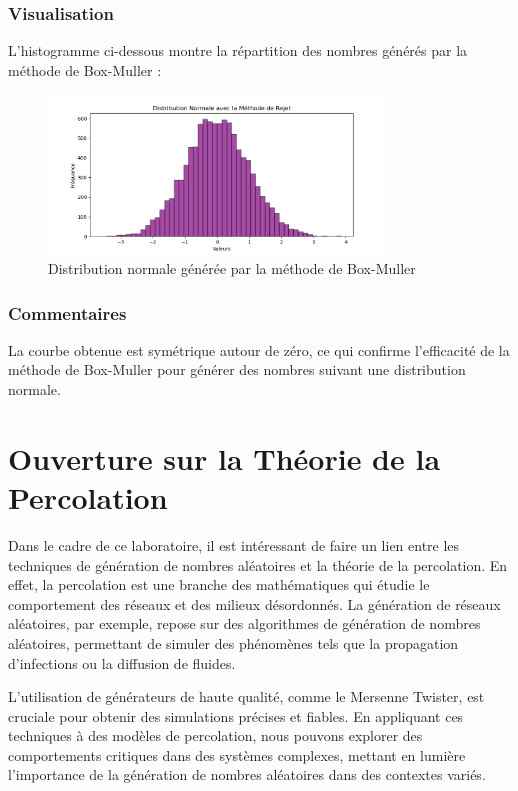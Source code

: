 \documentclass[a4paper,12pt]{report}
\begin{document}
\subsection*{Visualisation}
L'histogramme ci-dessous montre la répartition des nombres générés par la méthode de Box-Muller :

\begin{figure}[h!]
    \centering
    \includegraphics[width=0.8\textwidth]{4.png}
    \caption{Distribution normale générée par la méthode de Box-Muller}
\end{figure}

\subsection*{Commentaires}
La courbe obtenue est symétrique autour de zéro, ce qui confirme l'efficacité de la méthode de Box-Muller pour générer des nombres suivant une distribution normale.

\newpage
\chapter*{Ouverture sur la Théorie de la Percolation}
Dans le cadre de ce laboratoire, il est intéressant de faire un lien entre les techniques de génération de nombres aléatoires et la théorie de la percolation. En effet, la percolation est une branche des mathématiques qui étudie le comportement des réseaux et des milieux désordonnés. La génération de réseaux aléatoires, par exemple, repose sur des algorithmes de génération de nombres aléatoires, permettant de simuler des phénomènes tels que la propagation d'infections ou la diffusion de fluides.

L'utilisation de générateurs de haute qualité, comme le Mersenne Twister, est cruciale pour obtenir des simulations précises et fiables. En appliquant ces techniques à des modèles de percolation, nous pouvons explorer des comportements critiques dans des systèmes complexes, mettant en lumière l'importance de la génération de nombres aléatoires dans des contextes variés.
\end{document}
